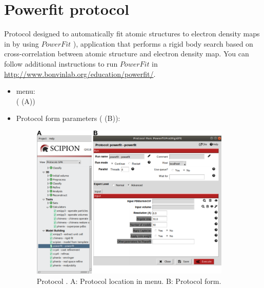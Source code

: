 \section{Powerfit protocol}
\label{app:powerfitProtocol}%
Protocol designed to automatically fit atomic structures to electron density maps in \scipion by using $PowerFit$ \citep{vanzundert2016}), application that performs a rigid body search based on cross-correlation between atomic structure and electron density map. You can follow additional instructions to run $PowerFit$ in \url{http://www.bonvinlab.org/education/powerfit/}.\\

   
 \begin{itemize}
  \item \scipion menu:\\
    ( (A))\\
  
  \item Protocol form parameters ( (B)):\\
  
    \begin{figure}[H]
     \centering 
     \captionsetup{width=.7\linewidth} 
     \includegraphics[width=0.90\textwidth]{Images_appendix/Fig113.pdf}
     \caption{Protocol . A: Protocol location in \scipion menu. B: Protocol form.}
     \label{fig:app_protocol_powerfit_1}
    \end{figure}


\end{itemize}
